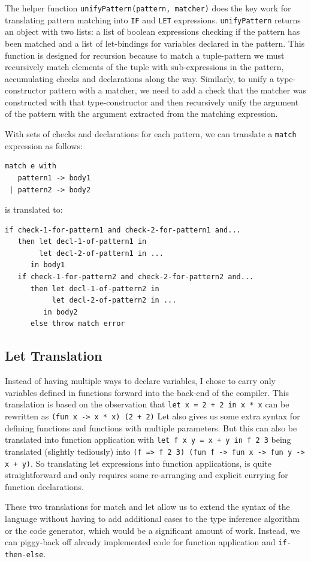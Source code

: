 \documentclass[12pt,a4paper,twoside,openright]{report}
\begin{document}
The helper function {\tt unifyPattern(pattern, matcher)} does the key work for translating pattern matching into {\tt IF} and {\tt LET} expressions.
{\tt unifyPattern} returns an object with two lists: a list of boolean expressions checking if the pattern has been matched and a list of let-bindings for variables declared in the pattern.
This function is designed for recursion because to match a tuple-pattern we must recursively match elements of the tuple with sub-expressions in the pattern, accumulating checks and declarations along the way.
Similarly, to unify a type-constructor pattern with a matcher, we need to add a check that the matcher was constructed with that type-constructor and then recursively unify the argument of the pattern with the argument extracted from the matching expression.

With sets of checks and declarations for each pattern, we can translate a {\tt match} expression as follows:
\begin{verbatim}
match e with
   pattern1 -> body1
 | pattern2 -> body2
\end{verbatim}
is translated to:
\begin{verbatim}
if check-1-for-pattern1 and check-2-for-pattern1 and...
   then let decl-1-of-pattern1 in
        let decl-2-of-pattern1 in ...
      in body1
   if check-1-for-pattern2 and check-2-for-pattern2 and...
      then let decl-1-of-pattern2 in
           let decl-2-of-pattern2 in ...
         in body2
      else throw match error
\end{verbatim}

\subsection{Let Translation}
Instead of having multiple ways to declare variables, I chose to carry only variables defined in functions forward into the back-end of the compiler.
This translation is based on the observation that {\tt let x = 2 + 2 in x * x} can be rewritten as {\tt (fun x -> x * x) (2 + 2)}
Let also gives us some extra syntax for defining functions and functions with multiple parameters.
But this can also be translated into function application with {\tt let f x y = x + y in f 2 3} being translated (slightly tediously) into {\tt (f => f 2 3) (fun f -> fun x -> fun y -> x + y)}.
So translating let expressions into function applications, is quite straightforward and only requires some re-arranging and explicit currying for function declarations.

These two translations for match and let allow us to extend the syntax of the language without having to add additional cases to the type inference algorithm or the code generator, which would be a significant amount of work.
Instead, we can piggy-back off already implemented code for function application and {\tt if-then-else}.
\end{document}
